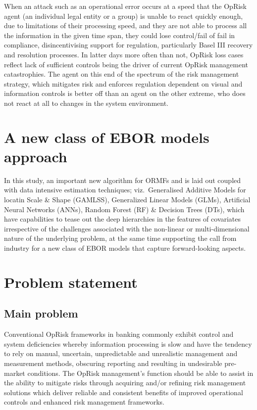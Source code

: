 \documentclass[
]{article}
\begin{document}
When an attack such as an operational error occurs at a speed that the
OpRisk agent (an individual legal entity or a group) is unable to react
quickly enough, due to limitations of their processing speed, and they
are not able to process all the information in the given time span, they
could lose control/fail of fail in compliance, disincentivising support
for regulation, particularly Basel III recovery and resolution
processes. In latter days more often than not, OpRisk loss cases reflect
lack of sufficient controls being the driver of current OpRisk
management catastrophies. The agent on this end of the spectrum of the
risk management strategy, which mitigates risk and enforces regulation
dependent on visual and information controls is better off than an agent
on the other extreme, who does not react at all to changes in the system
environment.

\section{A new class of EBOR models approach}
\label{sec:A new class of EBOR models approach}

In this study, an important new algorithm for ORMFs and is laid out
coupled with data intensive estimation techniques; viz.~Generalised
Additive Models for locatin Scale \& Shape (GAMLSS), Generalized Linear
Models (GLMs), Artificial Neural Networks (ANNs), Random Forest (RF) \&
Decision Trees (DTs), which have capabilities to tease out the deep
hierarchies in the features of covariates irrespective of the challenges
associated with the non-linear or multi-dimensional nature of the
underlying problem, at the same time supporting the call from industry
for a new class of EBOR models that capture forward-looking aspects.

\section{Problem statement}
\label{sec:Problem statement}

\subsection{Main problem}
\label{ssec:Main problem}

Conventional OpRisk frameworks in banking commonly exhibit control and
system deficiencies whereby information processing is slow and have the
tendency to rely on manual, uncertain, unpredictable and unrealistic
management and measurement methods, obscuring reporting and resulting in
undesirable pre-market conditions. The OpRisk management's function
should be able to assist in the ability to mitigate risks through
acquiring and/or refining risk management solutions which deliver
reliable and consistent benefits of improved operational controls and
enhanced risk management frameworks.\medskip
\end{document}
